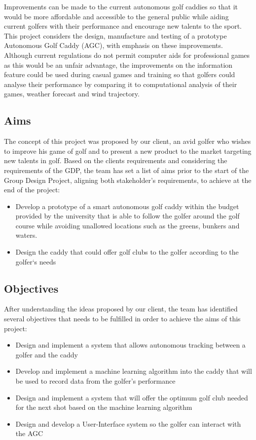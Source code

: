 \documentclass[11pt,landscape]{article}
\begin{document}
\begin{multicols}{2}
Improvements can be made to the current autonomous golf caddies so that it would
be more affordable and accessible to the general public while aiding current
golfers with their performance and encourage new talents to the sport. This
project considers the design, manufacture and testing of a prototype Autonomous
Golf Caddy (AGC), with emphasis on these improvements. Although current
regulations do not permit computer aids for professional games as this would be
an unfair advantage, the improvements on the information feature could be used
during casual games and training so that golfers could analyse their performance
by comparing it to computational analysis of their games, weather forecast and
wind trajectory.  

\subsection{Aims}
The concept of this project was proposed by our client, an avid golfer who wishes
to improve his game of golf and to present a new product to the market
targeting new talents in golf. Based on the clients requirements and considering
the requirements of the GDP, the team has set a list of aims prior to the start
of the Group Design Project, aligning both stakeholder's requirements, to
achieve at the end of the project: 
\begin{itemize}
    \item Develop a prototype of a smart autonomous golf caddy within the budget
    provided by the university that is able to follow the golfer around the golf
    course while avoiding unallowed locations such as the greens, bunkers and
    waters. 
    \item Design the caddy that could offer golf clubs to the golfer according
    to the golfer`s needs 
\end{itemize}

\subsection{Objectives}
After understanding the ideas proposed by our client, the team has identified
several objectives that needs to be fulfilled in order to achieve the aims of
this project: 
\begin{itemize}
    \item Design and implement a system that allows autonomous tracking between
    a golfer and the caddy 
    \item Develop and implement a machine learning algorithm into the caddy that
    will be used to record data from the golfer’s performance 
    \item Design and implement a system that will offer the optimum golf club
    needed for the next shot based on the machine learning algorithm 
    \item Design and develop a User-Interface system so the golfer can interact
    with the AGC
\end{itemize}


\end{multicols}
\end{document}
